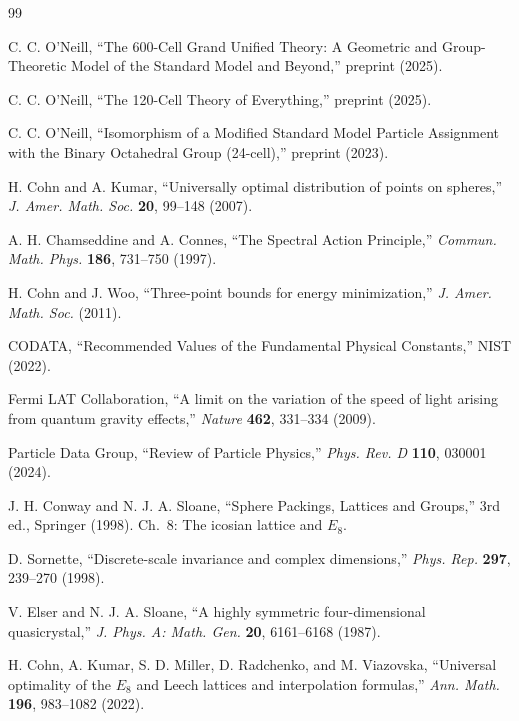 \documentclass[12pt,a4paper]{article}
\begin{document}
\begin{thebibliography}{99}


C. C. O'Neill, ``The 600-Cell Grand Unified Theory: A Geometric and Group-Theoretic Model of the Standard Model and Beyond,'' preprint (2025).

C. C. O'Neill, ``The 120-Cell Theory of Everything,'' preprint (2025).

C. C. O'Neill, ``Isomorphism of a Modified Standard Model Particle Assignment with the Binary Octahedral Group (24-cell),'' preprint (2023).


H. Cohn and A. Kumar, ``Universally optimal distribution of points on spheres,'' \textit{J. Amer. Math. Soc.} \textbf{20}, 99--148 (2007).

A. H. Chamseddine and A. Connes, ``The Spectral Action Principle,'' \textit{Commun. Math. Phys.} \textbf{186}, 731--750 (1997).

H. Cohn and J. Woo, ``Three-point bounds for energy minimization,'' \textit{J. Amer. Math. Soc.} (2011).


CODATA, ``Recommended Values of the Fundamental Physical Constants,'' NIST (2022).

Fermi LAT Collaboration, ``A limit on the variation of the speed of light arising from quantum gravity effects,'' \textit{Nature} \textbf{462}, 331--334 (2009).

Particle Data Group, ``Review of Particle Physics,'' \textit{Phys. Rev. D} \textbf{110}, 030001 (2024).


J. H. Conway and N. J. A. Sloane, ``Sphere Packings, Lattices and Groups,'' 3rd ed., Springer (1998). Ch.~8: The icosian lattice and $E_8$.


D. Sornette, ``Discrete-scale invariance and complex dimensions,'' \textit{Phys. Rep.} \textbf{297}, 239--270 (1998).



V. Elser and N. J. A. Sloane, ``A highly symmetric four-dimensional quasicrystal,'' \textit{J. Phys. A: Math. Gen.} \textbf{20}, 6161--6168 (1987).


H. Cohn, A. Kumar, S. D. Miller, D. Radchenko, and M. Viazovska, ``Universal optimality of the $E_8$ and Leech lattices and interpolation formulas,'' \textit{Ann. Math.} \textbf{196}, 983--1082 (2022).

\end{thebibliography}
\end{document}
